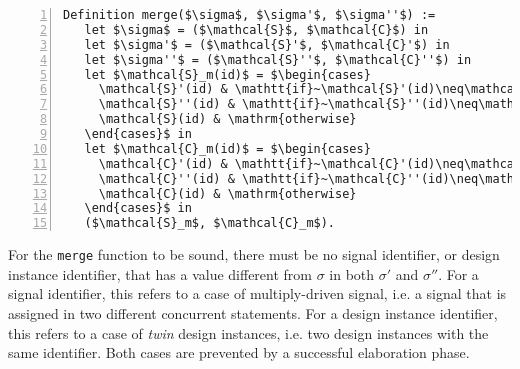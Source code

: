 \begin{lstlisting}[language=PseudoCoq,label={lst:merge-functionr},
caption={[The \texttt{merge} function.] The \texttt{merge} function that fuses together an origin state $\sigma$, with two states $\sigma'$ and $\sigma''$ generated by the execution of two \hvhdl{} concurrent statements.},framexleftmargin=1.5em,xleftmargin=2em,numbers=left,
numberstyle=\tiny\ttfamily]
Definition merge($\sigma$, $\sigma'$, $\sigma''$) :=
   let $\sigma$ = ($\mathcal{S}$, $\mathcal{C}$) in
   let $\sigma'$ = ($\mathcal{S}'$, $\mathcal{C}'$) in
   let $\sigma''$ = ($\mathcal{S}''$, $\mathcal{C}''$) in
   let $\mathcal{S}_m(id)$ = $\begin{cases} 
     \mathcal{S}'(id) & \mathtt{if}~\mathcal{S}'(id)\neq\mathcal{S}(id) \\ 
     \mathcal{S}''(id) & \mathtt{if}~\mathcal{S}''(id)\neq\mathcal{S}(id) \\
     \mathcal{S}(id) & \mathrm{otherwise}
   \end{cases}$ in
   let $\mathcal{C}_m(id)$ = $\begin{cases} 
     \mathcal{C}'(id) & \mathtt{if}~\mathcal{C}'(id)\neq\mathcal{C}(id) \\ 
     \mathcal{C}''(id) & \mathtt{if}~\mathcal{C}''(id)\neq\mathcal{C}(id) \\
     \mathcal{C}(id) & \mathrm{otherwise}
   \end{cases}$ in 
   ($\mathcal{S}_m$, $\mathcal{C}_m$).
\end{lstlisting}

For the \texttt{merge} function to be sound, there must be no signal
identifier, or design instance identifier, that has a value different
from $\sigma$ in both $\sigma'$ and $\sigma''$. For a signal
identifier, this refers to a case of multiply-driven signal, i.e. a
signal that is assigned in two different concurrent statements. For a
design instance identifier, this refers to a case of \textit{twin}
design instances, i.e. two design instances with the same
identifier. Both cases are prevented by a successful elaboration
phase.


